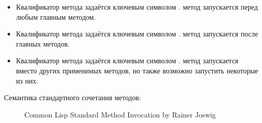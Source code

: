 \begin{itemize}

\item 
Квалификатор  метода задаётся ключевым символом
.  метод запускается перед любым главным методом.

\item 
Квалификатор  метода задаётся ключевым символом
.  метод запускается после главных методов.

\item 
Квалификатор  метода задаётся ключевым символом
.  метод запускается вместо других применимых методов,
но также возможно запустить некоторые из них.
\end{itemize}

Семантика стандартного сочетания методов:

\begin{figure}
\caption{Common Lisp Standard Method Invocation by Rainer Joswig}
\label{METHOD-COMBINATION-GRAPHIC}
\small\noindent
\end{figure}


